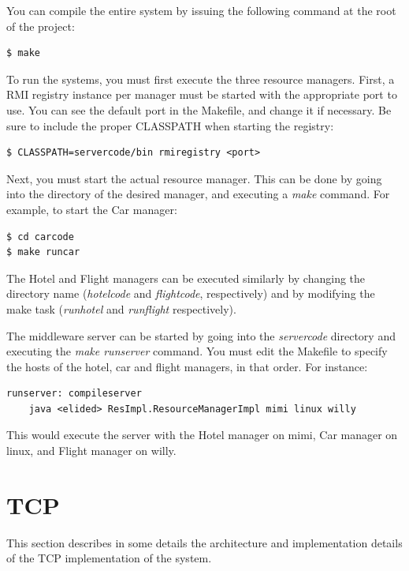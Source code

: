\documentclass[11pt]{article}
\begin{document}
You can compile the entire system by issuing the following command at
the root of the project:


\begin{verbatim}
$ make
\end{verbatim}

To run the systems, you must first execute the three resource
managers.  First, a RMI registry instance per manager must be started
with the appropriate port to use.  You can see the default port in the
Makefile, and change it if necessary.  Be sure to include the proper
CLASSPATH when starting the registry:

\begin{verbatim}
$ CLASSPATH=servercode/bin rmiregistry <port>
\end{verbatim}


Next, you must start the actual resource manager. This can be done by
going into the directory of the desired manager, and executing a {\it
  make} command.  For example, to start the Car manager:

\begin{verbatim}
$ cd carcode
$ make runcar
\end{verbatim}

The Hotel and Flight managers can be executed similarly by changing
the directory name ({\it hotelcode} and {\it flightcode},
respectively) and by modifying the make task ({\it runhotel} and {\it
  runflight} respectively).

The middleware server can be started by going into the {\it
  servercode} directory and executing the {\it make runserver}
command.  You must edit the Makefile to specify the hosts of the
hotel, car and flight managers, in that order.  For instance:


\begin{verbatim}
runserver: compileserver
    java <elided> ResImpl.ResourceManagerImpl mimi linux willy
\end{verbatim}

This would execute the server with the Hotel manager on mimi, Car
manager on linux, and Flight manager on willy.



\section{TCP}

This section describes in some details the architecture and
implementation details of the TCP implementation of the system.
\end{document}
